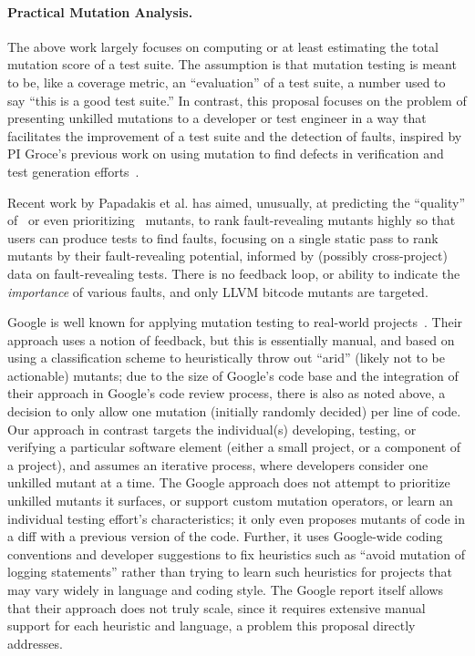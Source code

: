 \paragraph{Practical Mutation Analysis.}
%
The above work largely focuses on computing or at least estimating the
total mutation score of a
test suite.  The assumption is that mutation testing is
meant to be, like a coverage metric, an ``evaluation'' of a
test suite, a number used to say ``this is a good test suite.''  In contrast,
this proposal focuses on the problem of presenting unkilled mutations to
a developer or test engineer in a way that facilitates the improvement
of a test suite and the detection of faults, inspired by PI Groce's
previous work on using mutation to find defects in verification
and test generation
efforts~\cite{groce2015verified,groce2018verified,mutKernel}.

Recent work by Papadakis et al. has
aimed, unusually, at predicting the ``quality'' of~\cite{MutQuality}
or even prioritizing~\cite{FaRM} mutants, to rank fault-revealing
mutants highly so that users can produce tests to find faults, focusing on a single static
pass to rank mutants by their fault-revealing potential, informed by
(possibly cross-project)
data on fault-revealing tests.  There is no feedback loop, or ability
to indicate the \emph{importance} of various faults, and only LLVM
bitcode mutants are targeted.  %

Google is well known for applying mutation
testing to real-world projects~\cite{MutGoogle}.  Their approach 
uses a notion of feedback, but this is  essentially manual, and based on
using a classification scheme to heuristically throw out ``arid''
(likely not to be actionable)
mutants; due to the size of Google's code base and the integration of
their approach in Google's code review process, there is also as noted
above, a
decision to only allow one mutation (initially randomly decided) per
line of code.  
Our approach in contrast targets the individual(s) developing, testing, or verifying a particular software
element (either a small project, or a component of a project), and
assumes an iterative process, where developers consider one unkilled
mutant at a time.  The Google approach does not attempt to prioritize
unkilled mutants it surfaces, or support custom mutation
operators, or learn an individual testing effort's characteristics; it only even
proposes mutants of code in a diff with a previous version of the
code.  Further, it uses
Google-wide coding conventions and developer suggestions to fix
heuristics such as ``avoid mutation of logging statements'' rather
than trying to learn such heuristics for
projects that may vary widely in language and coding style.  The Google report
itself allows that their approach does not truly scale, since it
requires extensive manual support for each heuristic and language, a
problem this proposal directly addresses.

